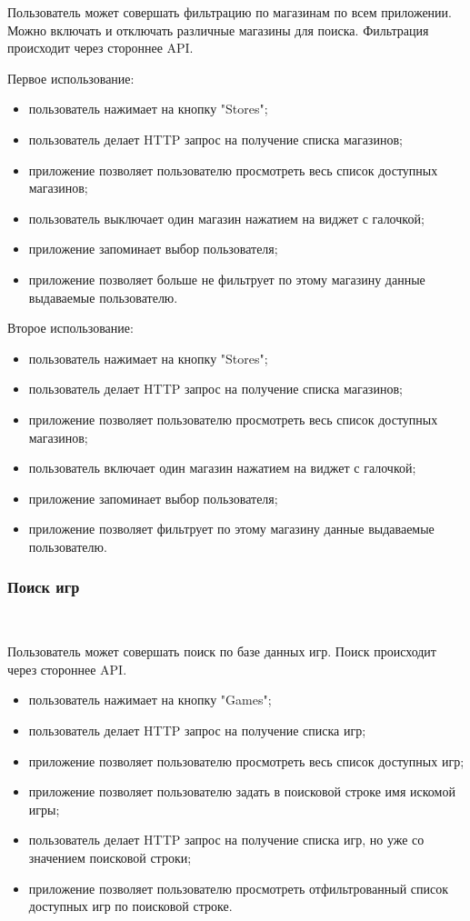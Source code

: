 Пользователь может совершать фильтрацию по магазинам по всем приложении. Можно включать и отключать различные магазины для поиска. Фильтрация происходит через стороннее API.

Первое использование:

\begin{itemize}
  \item пользователь нажимает на кнопку "Stores";
  \item пользователь делает HTTP запрос на получение списка магазинов;
  \item приложение позволяет пользователю просмотреть весь список доступных магазинов;
  \item пользователь выключает один магазин нажатием на виджет с галочкой;
  \item приложение запоминает выбор пользователя;
  \item приложение позволяет больше не фильтрует по этому магазину данные выдаваемые пользователю.
\end{itemize}

Второе использование:

\begin{itemize}
  \item пользователь нажимает на кнопку "Stores";
  \item пользователь делает HTTP запрос на получение списка магазинов;
  \item приложение позволяет пользователю просмотреть весь список доступных магазинов;
  \item пользователь включает один магазин нажатием на виджет с галочкой;
  \item приложение запоминает выбор пользователя;
  \item приложение позволяет фильтрует по этому магазину данные выдаваемые пользователю.
\end{itemize}

\subsubsection{Поиск игр}~\par

Пользователь может совершать поиск по базе данных игр. Поиск происходит через стороннее API.

\begin{itemize}
  \item пользователь нажимает на кнопку "Games";
  \item пользователь делает HTTP запрос на получение списка игр;
  \item приложение позволяет пользователю просмотреть весь список доступных игр;
  \item приложение позволяет пользователю задать в поисковой строке имя искомой игры;
  \item пользователь делает HTTP запрос на получение списка игр, но уже со значением поисковой строки;
  \item приложение позволяет пользователю просмотреть отфильтрованный список доступных игр по поисковой строке.
\end{itemize}

